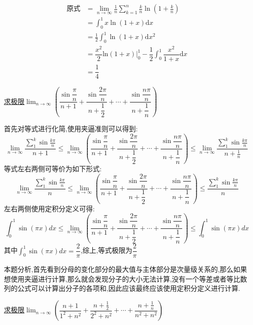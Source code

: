 \documentclass[8pt a4paper, oneside, UTF8]{ctexbook}
\begin{document}
\begin{sloppypar}
\begin{solution}
        \begin{align*}
          \text{原式} & =\lim_{n\to\infty}\frac1n\sum_{k=1}^n\frac kn\ln\left(1+\frac kn\right)\\
          & = \int_0^1x\ln(1+x)\mathrm{d}x\\
          & = \frac12\int_0^1\ln\left(1+x\right)\mathrm{d}x^2\\
          & =\dfrac{x^2}2\mathrm{ln}(1+x)\Bigg|_0^1-\dfrac12\int_0^1\dfrac{x^2}{1+x}\mathrm{d}x  \\
          & = \dfrac{1}{4}
        \end{align*}
    \end{solution}
    \begin{problem}
        \uline{求极限}$\lim_{n\to\infty}\left(\dfrac{\sin\dfrac\pi n}{n+1}+\dfrac{\sin\dfrac{2\pi}n}{n+\dfrac12}+\cdots+\dfrac{\sin\dfrac{n\pi}n}{n+\dfrac1n}\right)$
    \end{problem}
    \begin{solution}
        首先对等式进行化简,使用夹逼准则可以得到:
        $$
        \lim_{n \to \infty}\dfrac{\sum_{1}^{k}\sin \frac{k \pi}{n}}{n+1} \leqslant \lim_{n\to\infty}\left(\dfrac{\sin\dfrac\pi n}{n+1}+\dfrac{\sin\dfrac{2\pi}n}{n+\dfrac12}+\cdots+\dfrac{\sin\dfrac{n\pi}n}{n+\dfrac1n}\right) \leqslant \lim_{n\to \infty}\dfrac{\sum_{1}^{k} \sin\frac{k \pi}{n}}{n+\frac1n}
        $$
        等式左右两侧可等价为如下形式:
        $$
        \lim_{n \to \infty}\dfrac{\sum_{1}^{k}\sin \frac{k \pi}{n}}{n} \leqslant \lim_{n\to\infty}\left(\dfrac{\sin\dfrac\pi n}{n+1}+\dfrac{\sin\dfrac{2\pi}n}{n+\dfrac12}+\cdots+\dfrac{\sin\dfrac{n\pi}n}{n+\dfrac1n}\right) \leqslant \dfrac{\sum_{1}^{k}\sin \frac{k \pi}{n}}{n}
        $$
        左右两侧使用定积分定义可得:
        $$
            \int_0 ^1 \sin (\pi x) dx \leqslant \lim_{n\to\infty}\left(\dfrac{\sin\dfrac\pi n}{n+1}+\dfrac{\sin\dfrac{2\pi}n}{n+\dfrac12}+\cdots+\dfrac{\sin\dfrac{n\pi}n}{n+\dfrac1n}\right) \leqslant \int_0 ^1 \sin (\pi x) dx
        $$
        其中$\int_0 ^1 \sin (\pi x) dx=\dfrac{2}{\pi}$,综上,等式极限为$\dfrac{2}{\pi}$
    \end{solution}
    \begin{note}
        本题分析,首先看到分母的变化部分的最大值与主体部分是次量级关系的,那么如果想使用夹逼进行计算,那么就会发现分子的大小无法计算,没有一个等差或者等比数列的公式可以计算出分子的各项和,因此应该最终应该使用定积分定义进行计算.
    \end{note}
    \begin{problem}
       \uline{求极限}$\lim_{n\to\infty}\left(\dfrac{n+1}{1^{2}+n^{2}}+\dfrac{n+\frac{1}{2}}{2^{2}+n^{2}}+\cdots+\dfrac{n+\frac{1}{n}}{n^{2}+n^{2}}\right)$

\end{problem}
\end{sloppypar}
\end{document}
